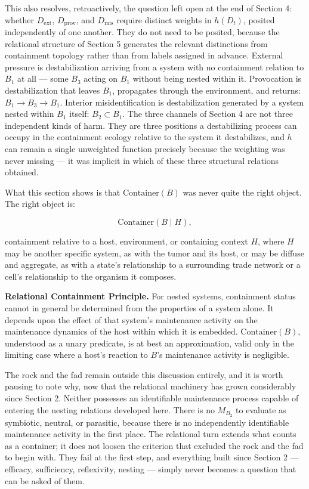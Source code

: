 \documentclass[11pt]{article}
\theoremstyle{plain}
\begin{document}
This also resolves, retroactively, the question left open at the end of Section 4: whether \(D_{\mathrm{ext}}\), \(D_{\mathrm{prov}}\), and \(D_{\mathrm{mis}}\) require distinct weights in \(h(D_t)\), posited independently of one another. They do not need to be posited, because the relational structure of Section 5 generates the relevant distinctions from containment topology rather than from labels assigned in advance. External pressure is destabilization arriving from a system with no containment relation to \(B_1\) at all --- some \(B_3\) acting on \(B_1\) without being nested within it. Provocation is destabilization that leaves \(B_1\), propagates through the environment, and returns: \(B_1 \to B_3 \to B_1\). Interior misidentification is destabilization generated by a system nested within \(B_1\) itself: \(B_2 \subset B_1\). The three channels of Section 4 are not three independent kinds of harm. They are three positions a destabilizing process can occupy in the containment ecology relative to the system it destabilizes, and \(h\) can remain a single unweighted function precisely because the weighting was never missing --- it was implicit in which of these three structural relations obtained.

What this section shows is that \(\mathrm{Container}(B)\) was never quite the right object. The right object is:

\[\mathrm{Container}(B \mid H),\]

containment relative to a host, environment, or containing context \(H\), where \(H\) may be another specific system, as with the tumor and its host, or may be diffuse and aggregate, as with a state's relationship to a surrounding trade network or a cell's relationship to the organism it composes.

\textbf{Relational Containment Principle.} For nested systems, containment status cannot in general be determined from the properties of a system alone. It depends upon the effect of that system's maintenance activity on the maintenance dynamics of the host within which it is embedded. \(\mathrm{Container}(B)\), understood as a unary predicate, is at best an approximation, valid only in the limiting case where a host's reaction to \(B\)'s maintenance activity is negligible.

The rock and the fad remain outside this discussion entirely, and it is worth pausing to note why, now that the relational machinery has grown considerably since Section 2. Neither possesses an identifiable maintenance process capable of entering the nesting relations developed here. There is no \(M_{B_2}\) to evaluate as symbiotic, neutral, or parasitic, because there is no independently identifiable maintenance activity in the first place. The relational turn extends what counts as a container; it does not loosen the criterion that excluded the rock and the fad to begin with. They fail at the first step, and everything built since Section 2 --- efficacy, sufficiency, reflexivity, nesting --- simply never becomes a question that can be asked of them.
\end{document}
